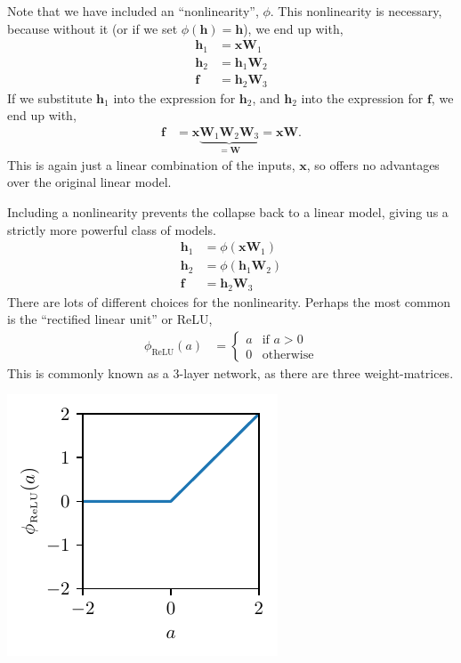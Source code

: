 \documentclass{article}
\newcommand{\x}{\mathbf{x}}
\newcommand{\f}{\mathbf{f}}
\newcommand{\h}{\mathbf{h}}
\newcommand{\W}{\mathbf{W}}
\begin{document}
Note that we have included an ``nonlinearity'', $\phi$.
This nonlinearity is necessary, because without it (or if we set $\phi(\h) = \h$), we end up with,
\begin{subequations}
\begin{align}
  \h_1 &= \x \W_1\\
  \h_2 &= \h_1 \W_2\\
  \f &= \h_2 \W_3
\end{align}
\end{subequations}
If we substitute $\h_1$ into the expression for $\h_2$, and $\h_2$ into the expression for $\f$, we end up with,
\begin{align}
  \f &= \x \underbrace{\W_1 \W_2 \W_3}_{=\W} = \x \W.
\end{align}
This is again just a linear combination of the inputs, $\x$, so offers no advantages over the original linear model.

Including a nonlinearity prevents the collapse back to a linear model, giving us a strictly more powerful class of models.
\begin{subequations}
\begin{align}
  \h_1 &= \phi(\x \W_1)\\
  \h_2 &= \phi(\h_1 \W_2)\\
  \f &= \h_2 \W_3
\end{align}
\end{subequations}
There are lots of different choices for the nonlinearity.  Perhaps the most common is the ``rectified linear unit'' or ReLU,
\begin{align}
  \phi_\text{ReLU}(a) &= \begin{cases}    
    a & \text{if } a > 0\\
    0 & \text{otherwise}
  \end{cases}  
\end{align}
This is commonly known as a 3-layer network, as there are three weight-matrices.

\begin{center}
  \includegraphics{relu}
\end{center}
\end{document}
